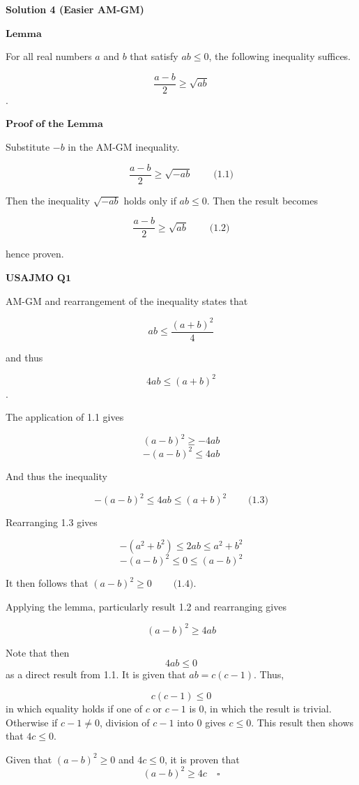 \begin{enumerate}
 



\textbf{Solution 4 (Easier AM-GM)}

$\textbf{Lemma}$

 For all real numbers $a$ and $b$ that satisfy $ab \le 0$, the following inequality suffices.

 
 \[\frac{a-b}{2} \ge \sqrt{ab}\].

 $\textbf{Proof of the Lemma}$

 Substitute $-b$ in the AM-GM inequality.

 
 \[\frac{a-b}{2} \ge \sqrt{-ab} ~~~~~~~~~~ \text{(1.1)}\]

 Then the inequality $\sqrt{-ab}$ holds only if $ab \le 0$. Then the result becomes 

 
 \[\frac{a-b}{2} \ge \sqrt{ab} ~~~~~~~~~~ \text{(1.2)}\] 

 hence proven.

 $\textbf{USAJMO Q1}$

 AM-GM and rearrangement of the inequality states that

 
 \[ab \le \frac{(a+b)^2}{4}\]

 and thus

 
 \[4ab \le (a+b)^2\].

 The application of 1.1 gives

 
 \[(a-b)^2 \ge -4ab\]
 \[-(a-b)^2 \le 4ab\]

 And thus the inequality

 
 \[-(a-b)^2 \le 4ab \le (a+b)^2 ~~~~~~~~~~ \text{(1.3)}\]

 Rearranging 1.3 gives

 
 \[-(a^2 + b^2) \le 2ab \le a^2 + b^2\]
 \[-(a-b)^2 \le 0 \le (a-b)^2\]

 It then follows that $(a-b)^2 \ge 0 ~~~~~~~~~~ \text{(1.4)}$. 

 Applying the lemma, particularly result 1.2 and rearranging gives

 
 \[(a-b)^2 \ge 4ab\]

 Note that then 
 \[4ab \le 0\] as a direct result from 1.1. It is given that $ab = c(c-1)$. Thus, 

 
 \[c(c-1) \le 0\] in which equality holds if one of $c$ or $c-1$ is 0, in which the result is trivial. Otherwise if $c-1 \neq 0$, division of $c-1$ into 0 gives $c \le 0$. This result then shows that $4c \le 0$. 

 Given that $(a-b)^2 \ge 0$ and $4c \le 0$, it is proven that 
 \[(a-b)^2 \ge 4c \quad \square\]


\end{enumerate}

